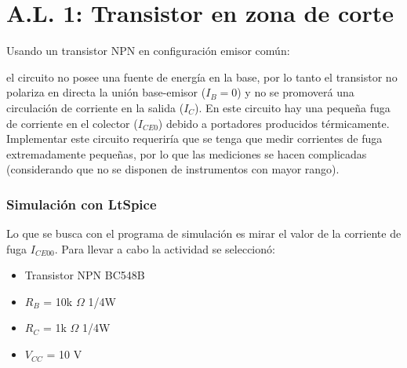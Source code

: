 \section{A.L. 1: Transistor en zona de corte}

Usando un transistor NPN en configuración emisor común:
\begin{center}
 \end{center}
el circuito no posee una fuente de energía en la base, por lo tanto el transistor no polariza en directa la unión base-emisor ($I_B = 0$) y no se promoverá una circulación de corriente en la salida ($I_C$). En este circuito hay una pequeña fuga de corriente en el colector ($I_{CE0}$) debido a portadores producidos térmicamente. Implementar este circuito requeriría que se tenga que medir corrientes de fuga extremadamente pequeñas, por lo que las mediciones se hacen complicadas (considerando que no se disponen de instrumentos con mayor rango).

\subsubsection{Simulación con LtSpice}
\sangria{} Lo que se busca con el programa de simulación es mirar el valor de la corriente de fuga $I_{CE00}$. Para llevar a cabo la actividad se seleccionó:
\newpage
\begin{itemize}[nosep]
    \item Transistor NPN BC548B
    \item $R_B$ = 10k $\Omega$ {\footnotesize 1/4W}
    \item $R_C$ = 1k $\Omega$ {\footnotesize 1/4W}
    \item $V_{CC}$ = 10 V
\end{itemize}



